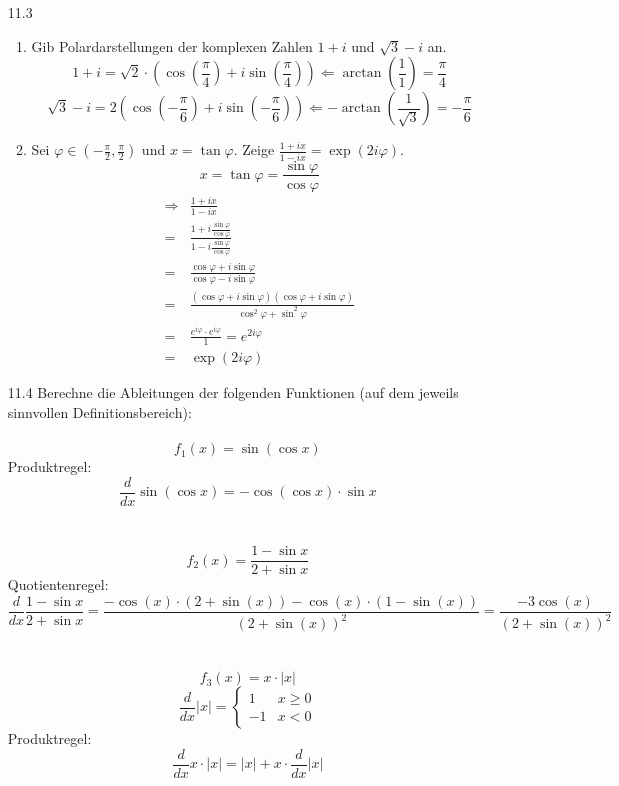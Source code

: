 \documentclass{HM}
\begin{document}
\begin{enumerate}
\item[11.3]
\begin{enumerate}
	\item Gib Polardarstellungen der komplexen Zahlen $1+i$ und $\sqrt{3}-i$ an.
	$$1+i = \sqrt{2}\cdot \left(\cos\left(\frac{\pi}{4}\right)+i\sin\left(\frac{\pi}{4}\right)\right) \Leftarrow \arctan\left(\frac{1}{1}\right)=\frac{\pi}{4}$$
	$$\sqrt{3}-i=2\left(\cos\left(-\frac{\pi}{6}\right)+i\sin\left(-\frac{\pi}{6}\right)\right) \Leftarrow -\arctan\left(\frac{1}{\sqrt{3}}\right)=-\frac{\pi}{6}$$
	\item Sei $\varphi\in\left(-\frac{\pi}{2},\frac{\pi}{2}\right)$ und $x=\tan\varphi$. Zeige $\frac{1+ix}{1-ix}=\exp(2i\varphi)$.
	$$x=\tan\varphi=\frac{\sin\varphi}{\cos\varphi}$$
	\begin{align*}
		\Rightarrow &\frac{1+ix}{1-ix}\\
		=&\frac{1+i\frac{\sin\varphi}{\cos\varphi}}{1-i\frac{\sin\varphi}{\cos\varphi}}\\
		=&\frac{\cos\varphi+i\sin\varphi}{\cos\varphi-i\sin\varphi}\\
		=&\frac{(\cos\varphi+i\sin\varphi)(\cos\varphi+i\sin\varphi)}{\cos^2\varphi+\sin^2\varphi}\\
		=&\frac{e^{i\varphi}\cdot e^{i\varphi}}{1}=e^{2i\varphi}\\
		=&\exp(2i\varphi)	
	\end{align*}
\end{enumerate}
\item [11.4] Berechne die Ableitungen der folgenden Funktionen (auf dem jeweils sinnvollen Definitionsbereich):\\\\
$$f_1(x)=\sin(\cos x)$$
Produktregel:
$$\frac{d}{dx}\sin(\cos x) = -\cos(\cos x)\cdot\sin x$$\\\\
$$f_2(x)=\frac{1-\sin x}{2+\sin x}$$
Quotientenregel:
$$\frac{d}{dx}\frac{1-\sin x}{2+\sin x}=\frac{-\cos(x)\cdot(2+\sin(x))-\cos(x)\cdot(1-\sin(x))}{(2+\sin(x))^2}=\frac{-3\cos(x)}{(2+\sin(x))^2}$$\\\\
$$f_3(x)=x\cdot|x|$$
$$\frac{d}{dx}|x|=\begin{cases}
1&x\geq0\\
-1&x<0
\end{cases}$$
Produktregel:
$$\frac{d}{dx}x\cdot|x|=|x|+x\cdot\frac{d}{dx}|x|$$\\\\

\end{enumerate}
\end{document}
